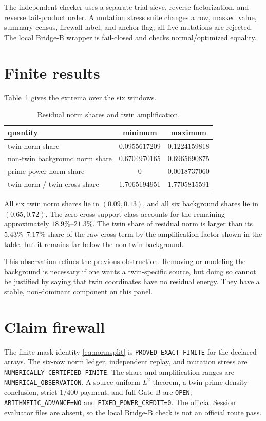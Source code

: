 \documentclass[10pt]{article}
\begin{document}
The independent checker uses a separate trial sieve, reverse factorization,
and reverse tail-product order.  A mutation stress suite changes a row,
masked value, summary census, firewall label, and anchor flag; all five
mutations are rejected.  The local Bridge-B wrapper is fail-closed and checks
normal/optimized equality.

\section{Finite results}

Table~\ref{tab:shares} gives the extrema over the six windows.
\begin{table}[ht]
\centering\small
\caption{Residual norm shares and twin amplification.}
\label{tab:shares}
\begin{tabular}{lcc}
\toprule
quantity & minimum & maximum\\
\midrule
twin norm share & 0.0955617209 & 0.1224159818\\
non-twin background norm share & 0.6704970165 & 0.6965690875\\
prime-power norm share & 0 & 0.0018737060\\
twin norm / twin cross share & 1.7065194951 & 1.7705815591\\
\bottomrule
\end{tabular}
\end{table}

All six twin norm shares lie in $(0.09,0.13)$, and all six background shares
lie in $(0.65,0.72)$.  The zero-cross-support class accounts for the remaining
approximately $18.9\%$--$21.3\%$.  The twin share of residual norm is larger
than its $5.43\%$--$7.17\%$ share of the raw cross term by the amplification
factor shown in the table, but it remains far below the non-twin background.

This observation refines the previous obstruction.  Removing or modeling the
background is necessary if one wants a twin-specific source, but doing so
cannot be justified by saying that twin coordinates have no residual energy.
They have a stable, non-dominant component on this panel.

\section{Claim firewall}

The finite mask identity \eqref{eq:normsplit} is
\texttt{PROVED\_EXACT\_FINITE} for the declared arrays.  The six-row norm
ledger, independent replay, and mutation stress are
\texttt{NUMERICALLY\_CERTIFIED\_FINITE}.  The share and amplification ranges
are \texttt{NUMERICAL\_OBSERVATION}.  A source-uniform $L^2$ theorem, a
twin-prime density conclusion, strict $1/400$ payment, and full Gate B are
\texttt{OPEN}; \texttt{ARITHMETIC\_ADVANCE=NO} and
\texttt{FIXED\_POWER\_CREDIT=0}.  The official Session evaluator files are
absent, so the local Bridge-B check is not an official route pass.
\end{document}
